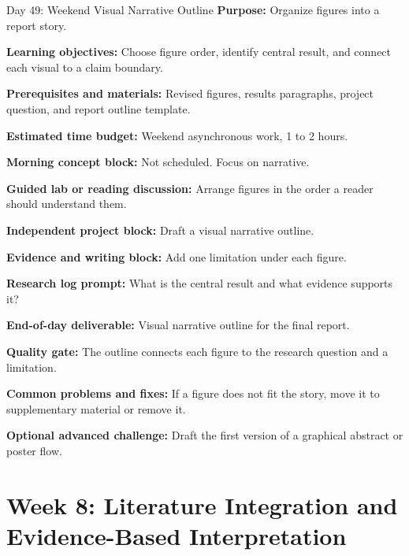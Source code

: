 \begin{dailybox}{Day 49: Weekend Visual Narrative Outline}
\textbf{Purpose:} Organize figures into a report story.

\textbf{Learning objectives:} Choose figure order, identify central result, and connect each visual to a claim boundary.

\textbf{Prerequisites and materials:} Revised figures, results paragraphs, project question, and report outline template.

\textbf{Estimated time budget:} Weekend asynchronous work, 1 to 2 hours.

\textbf{Morning concept block:} Not scheduled. Focus on narrative.

\textbf{Guided lab or reading discussion:} Arrange figures in the order a reader should understand them.

\textbf{Independent project block:} Draft a visual narrative outline.

\textbf{Evidence and writing block:} Add one limitation under each figure.

\textbf{Research log prompt:} What is the central result and what evidence supports it?

\textbf{End-of-day deliverable:} Visual narrative outline for the final report.

\textbf{Quality gate:} The outline connects each figure to the research question and a limitation.

\textbf{Common problems and fixes:} If a figure does not fit the story, move it to supplementary material or remove it.

\textbf{Optional advanced challenge:} Draft the first version of a graphical abstract or poster flow.
\end{dailybox}

\section{Week 8: Literature Integration and Evidence-Based Interpretation}

